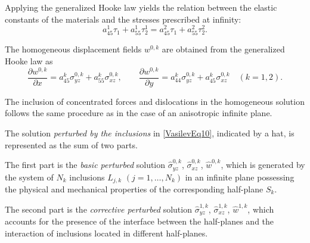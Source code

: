 Applying the generalized Hooke law yields the relation between the elastic constants of the materials and the stresses prescribed at infinity:
\begin{equation*}
	a_{45}^{1}\tau_1+a_{55}^{1}\tau_2^{1}
	=
	a_{45}^{2}\tau_1+a_{55}^{2}\tau_2^{2}.
\end{equation*}

The homogeneous displacement fields $w^{0,k}$ are obtained from the generalized Hooke law as
\[
\frac{\partial w^{0,k}}{\partial x}
=
a_{45}^{k}\sigma_{yz}^{0,k}
+
a_{55}^{k}\sigma_{xz}^{0,k},
\qquad
\frac{\partial w^{0,k}}{\partial y}
=
a_{44}^{k}\sigma_{yz}^{0,k}
+
a_{45}^{k}\sigma_{xz}^{0,k}
\quad
(k=1,2).
\]

The inclusion of concentrated forces and dislocations in the homogeneous solution follows the same procedure as in the case of an anisotropic infinite plane.

The solution \emph{perturbed by the inclusions} in \eqref{VasilevEq10}, indicated by a hat, is represented as the sum of two parts.

The first part is the \emph{basic perturbed} solution
$\widehat{\sigma}_{yz}^{0,k}$,
$\widehat{\sigma}_{xz}^{0,k}$,
$\widehat{w}^{0,k}$,
which is generated by the system of $N_k$ inclusions $L_{j,k}$ $(j=1,\ldots,N_k)$ in an infinite plane possessing the physical and mechanical properties of the corresponding half-plane $S_k$.

The second part is the \emph{corrective perturbed} solution
$\widehat{\sigma}_{yz}^{1,k}$,
$\widehat{\sigma}_{xz}^{1,k}$,
$\widehat{w}^{1,k}$,
which accounts for the presence of the interface between the half-planes and the interaction of inclusions located in different half-planes.

